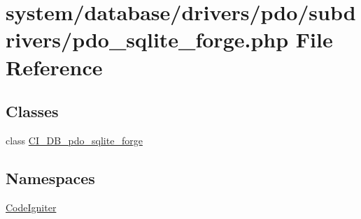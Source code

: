 \hypertarget{pdo__sqlite__forge_8php}{}\section{system/database/drivers/pdo/subdrivers/pdo\+\_\+sqlite\+\_\+forge.php File Reference}
\label{pdo__sqlite__forge_8php}
\subsection*{Classes}
\begin{DoxyCompactItemize}
\item 
class \mbox{\hyperlink{class_c_i___d_b__pdo__sqlite__forge}{C\+I\+\_\+\+D\+B\+\_\+pdo\+\_\+sqlite\+\_\+forge}}
\end{DoxyCompactItemize}
\subsection*{Namespaces}
\begin{DoxyCompactItemize}
\item 
 \mbox{\hyperlink{namespace_code_igniter}{Code\+Igniter}}
\end{DoxyCompactItemize}
